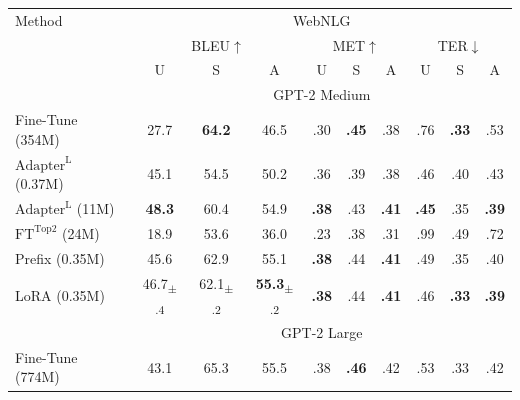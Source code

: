 \documentclass{article} %
\begin{document}
\begin{table}[h]
\centering
\begin{tabular}{l|ccc|ccc|ccc}
\hline
\toprule
Method & \multicolumn{9}{c}{WebNLG} \\ %
       & \multicolumn{3}{c}{BLEU$\uparrow$}  &  \multicolumn{3}{c}{MET$\uparrow$} & \multicolumn{3}{c}{TER$\downarrow$ } \\
       & U & S & A & U & S & A & U & S & A \\
\midrule
&  \multicolumn{9}{c}{GPT-2 Medium}\\
Fine-Tune (354M)                    & 27.7                                  & \textbf{64.2}                         & 46.5                                  & .30           & \textbf{.45}  & .38           &.76            & \textbf{.33}           & .53  \\
$\text{Adapter}^{\text{L}}$ (0.37M)  & 45.1                                  & 54.5                                  & 50.2                                  & .36           & .39           & .38           & .46           & .40           & .43 \\
$\text{Adapter}^{\text{L}}$ (11M)   & \textbf{48.3}                         & 60.4                                  & 54.9                                  & \textbf{.38}  & .43           & \textbf{.41}  & \textbf{.45}  & .35           &  \textbf{.39} \\
$\text{FT}^{\text{Top2}}$ (24M)     & 18.9                                  & 53.6                                  & 36.0                                  & .23           & .38           & .31           & .99          & .49           & .72 \\
Prefix (0.35M)                      & 45.6                                  & 62.9                                  & 55.1                                  & \textbf{.38}  & .44           & \textbf{.41}  & .49           & .35           & .40   \\
LoRA (0.35M)                        & 46.7\textsubscript{$\pm$.4}           & 62.1\textsubscript{$\pm$.2}           & \textbf{55.3}\textsubscript{$\pm$.2}  & \textbf{.38}  & .44           & \textbf{.41}  & .46           & \textbf{.33}  & \textbf{.39} \\
\midrule
& \multicolumn{9}{c}{GPT-2 Large}\\
Fine-Tune (774M)                    & 43.1                                  & 65.3                                  & 55.5                                  & .38           & \textbf{.46}  & .42           & .53           & .33           & .42  \\

\end{tabular}
\end{table}
\end{document}
